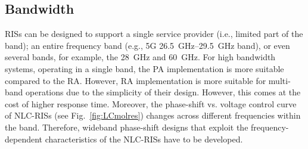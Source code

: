 \subsection{Bandwidth}

\glspl{RIS} can be designed to support a single service provider (i.e., limited part of the band); an entire frequency band (e.g., 5G \SIrange{26.5}{29.5}{\giga\hertz} band), or even several bands, for example, the \SI{28}{\giga\hertz} and \SI{60}{\giga\hertz}. 
For high bandwidth systems, operating in a single band, the \gls{PA} implementation is more suitable compared to the \gls{RA}. However, \gls{RA} implementation is more suitable for multi-band operations due to the simplicity of their design. However, this comes at the cost of higher response time. Moreover, the phase-shift vs. voltage control curve of \gls{NLC}-\glspl{RIS} (see Fig.~\ref{fig:LCmolres}) changes across different frequencies within the band. Therefore, wideband phase-shift designs that exploit the frequency-dependent characteristics of the \gls{NLC}-\glspl{RIS} have to be developed.%
